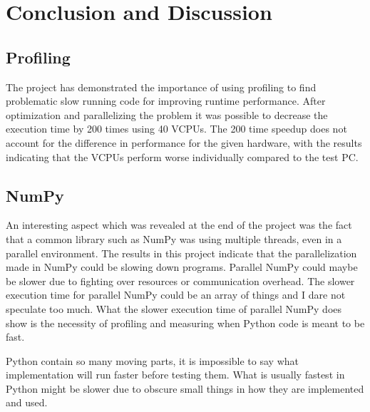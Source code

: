 \documentclass[12pt, a4paper]{article}
\begin{document}

\section{Conclusion and Discussion}

\subsection{Profiling}

The project has demonstrated the importance of using profiling to find problematic slow running code for improving runtime performance.
After optimization and parallelizing the problem it was possible to decrease the execution time by 200 times using 40 VCPUs. 
The 200 time speedup does not account for the difference in performance for the given hardware, with the results indicating that the VCPUs perform worse individually compared to the test PC.

\subsection{NumPy}

An interesting aspect which was revealed at the end of the project was the fact that a common library such as NumPy was using multiple threads, even in a parallel environment.
The results in this project indicate that the parallelization made in NumPy could be slowing down programs.
Parallel NumPy could maybe be slower due to fighting over resources or communication overhead.
The slower execution time for parallel NumPy could be an array of things and I dare not speculate too much. 
What the slower execution time of parallel NumPy does show is the necessity of profiling and measuring when Python code is meant to be fast.

Python contain so many moving parts, it is impossible to say what implementation will run faster before testing them.
What is usually fastest in Python might be slower due to obscure small things in how they are implemented and used.
\end{document}

